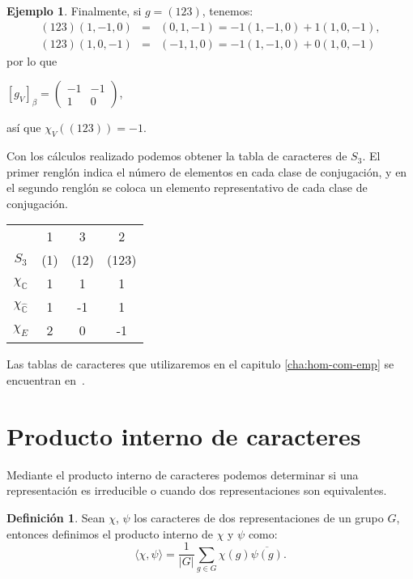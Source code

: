 \documentclass[12pt]{book}
\theoremstyle{definition}
\newtheorem{definition}[theorem]{Definición}
\newtheorem{example}[theorem]{Ejemplo}
\newcounter{in}
\newcounter{ini}
\begin{document}
\begin{example}
Finalmente, si $g=(123)$, tenemos:
\begin{eqnarray*}
  (123)(1,-1,0)&=&(0,1,-1)=-1(1,-1,0)+1(1,0,-1),\\
  (123)(1,0,-1)&=&(-1,1,0)=-1(1,-1,0)+0(1,0,-1)
\end{eqnarray*} 
 por lo que 
  \begin{center}
  $[g_{V}]_{\beta}=
  \begin{pmatrix}
    -1 & -1 \\
    1 & 0 
  \end{pmatrix}$,
\end{center}
así que $\chi_{V}((123))=-1$.

Con los cálculos realizado podemos obtener la tabla de caracteres de
$S_{3}$. El primer renglón indica el número de elementos en cada clase de
conjugación, y en el segundo renglón se coloca un elemento representativo de cada
clase de conjugación.
\begin{center}
  \begin{tabular}{ c| c c c}
    & 1 & 3 & 2 \\
    $S_{3}$ & (1) & (12) & (123) \\
    \hline
    $\chi_{\mathbb{C}}$ & 1 & 1 & 1 \\
    $\chi_{\mathbb{\hat C}}$ & 1 & -1 & 1 \\
    $\chi_{E}$ & 2 & 0 & -1 
  \end{tabular}  
\end{center}
Las tablas de caracteres que utilizaremos en el capitulo \ref{cha:hom-com-emp}
se encuentran en~\cite{liebeck}.
\end{example}

\section{Producto interno de caracteres}
\label{producto-interno}

Mediante el producto interno de caracteres  podemos determinar si una
representación es irreducible o cuando dos representaciones son equivalentes.
\begin{definition}
  Sean $\chi$, $\psi$ los caracteres de dos representaciones de un grupo
  $G$, entonces definimos el producto interno de $\chi$ y $\psi$ como:
  \begin{equation*}
    \langle\chi,\psi\rangle=\frac{1}{|G|}\sum_{g\in G}\chi(g)\overline{\psi(g)}.
  \end{equation*}
\end{definition}
\end{document}
